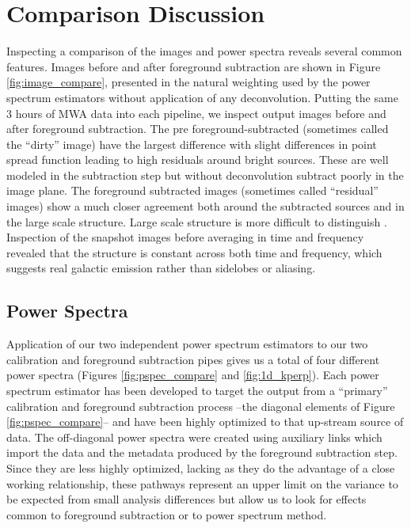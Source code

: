 \documentclass[twolcolumn,iop]{emulateapj}
\begin{document}
\section{Comparison Discussion}
\label{sec:results}
Inspecting a comparison of the images and power spectra reveals several common features. Images before and after foreground subtraction are shown in Figure \ref{fig:image_compare}, presented in the natural weighting used by the power spectrum estimators without application of any deconvolution.  Putting the same 3 hours of MWA data into each pipeline, we inspect output images before and after foreground subtraction. The pre foreground-subtracted (sometimes called the ``dirty'' image) have the largest difference with slight differences in point spread function leading to high residuals around bright sources. These are well modeled in the subtraction step but without deconvolution subtract poorly in the image plane.  The foreground subtracted images (sometimes called ``residual'' images) show a much closer agreement both around the subtracted sources and in the large scale structure. Large scale structure is more difficult to distinguish . Inspection of the snapshot images before averaging in time and frequency revealed that the structure is constant across both time and frequency, which suggests real galactic emission rather than sidelobes or aliasing.  



\subsection{Power Spectra}

Application of our two independent power spectrum estimators to our two calibration and foreground subtraction pipes gives us a total of four different power spectra (Figures \ref{fig:pspec_compare} and \ref{fig:1d_kperp}).  Each power spectrum estimator has been developed to target the output from a ``primary'' calibration and foreground subtraction process --the diagonal elements of Figure \ref{fig:pspec_compare}-- and have been highly optimized to that up-stream source of data.  The off-diagonal power spectra were created using auxiliary links which import the data and the metadata produced by the foreground subtraction step.  Since they are less highly optimized, lacking as they do the advantage of a close working relationship, these pathways represent an upper limit on the variance to be expected from small analysis differences but allow us to look for effects common to foreground subtraction or to power spectrum method.
\end{document}
